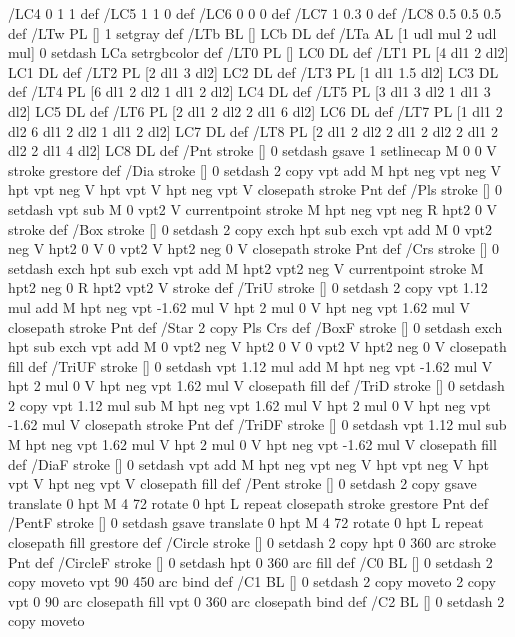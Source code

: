 {{/LC4 {0 1 1} def
/LC5 {1 1 0} def
/LC6 {0 0 0} def
/LC7 {1 0.3 0} def
/LC8 {0.5 0.5 0.5} def
/LTw {PL [] 1 setgray} def
/LTb {BL [] LCb DL} def
/LTa {AL [1 udl mul 2 udl mul] 0 setdash LCa setrgbcolor} def
/LT0 {PL [] LC0 DL} def
/LT1 {PL [4 dl1 2 dl2] LC1 DL} def
/LT2 {PL [2 dl1 3 dl2] LC2 DL} def
/LT3 {PL [1 dl1 1.5 dl2] LC3 DL} def
/LT4 {PL [6 dl1 2 dl2 1 dl1 2 dl2] LC4 DL} def
/LT5 {PL [3 dl1 3 dl2 1 dl1 3 dl2] LC5 DL} def
/LT6 {PL [2 dl1 2 dl2 2 dl1 6 dl2] LC6 DL} def
/LT7 {PL [1 dl1 2 dl2 6 dl1 2 dl2 1 dl1 2 dl2] LC7 DL} def
/LT8 {PL [2 dl1 2 dl2 2 dl1 2 dl2 2 dl1 2 dl2 2 dl1 4 dl2] LC8 DL} def
/Pnt {stroke [] 0 setdash gsave 1 setlinecap M 0 0 V stroke grestore} def
/Dia {stroke [] 0 setdash 2 copy vpt add M
  hpt neg vpt neg V hpt vpt neg V
  hpt vpt V hpt neg vpt V closepath stroke
  Pnt} def
/Pls {stroke [] 0 setdash vpt sub M 0 vpt2 V
  currentpoint stroke M
  hpt neg vpt neg R hpt2 0 V stroke
 } def
/Box {stroke [] 0 setdash 2 copy exch hpt sub exch vpt add M
  0 vpt2 neg V hpt2 0 V 0 vpt2 V
  hpt2 neg 0 V closepath stroke
  Pnt} def
/Crs {stroke [] 0 setdash exch hpt sub exch vpt add M
  hpt2 vpt2 neg V currentpoint stroke M
  hpt2 neg 0 R hpt2 vpt2 V stroke} def
/TriU {stroke [] 0 setdash 2 copy vpt 1.12 mul add M
  hpt neg vpt -1.62 mul V
  hpt 2 mul 0 V
  hpt neg vpt 1.62 mul V closepath stroke
  Pnt} def
/Star {2 copy Pls Crs} def
/BoxF {stroke [] 0 setdash exch hpt sub exch vpt add M
  0 vpt2 neg V hpt2 0 V 0 vpt2 V
  hpt2 neg 0 V closepath fill} def
/TriUF {stroke [] 0 setdash vpt 1.12 mul add M
  hpt neg vpt -1.62 mul V
  hpt 2 mul 0 V
  hpt neg vpt 1.62 mul V closepath fill} def
/TriD {stroke [] 0 setdash 2 copy vpt 1.12 mul sub M
  hpt neg vpt 1.62 mul V
  hpt 2 mul 0 V
  hpt neg vpt -1.62 mul V closepath stroke
  Pnt} def
/TriDF {stroke [] 0 setdash vpt 1.12 mul sub M
  hpt neg vpt 1.62 mul V
  hpt 2 mul 0 V
  hpt neg vpt -1.62 mul V closepath fill} def
/DiaF {stroke [] 0 setdash vpt add M
  hpt neg vpt neg V hpt vpt neg V
  hpt vpt V hpt neg vpt V closepath fill} def
/Pent {stroke [] 0 setdash 2 copy gsave
  translate 0 hpt M 4 {72 rotate 0 hpt L} repeat
  closepath stroke grestore Pnt} def
/PentF {stroke [] 0 setdash gsave
  translate 0 hpt M 4 {72 rotate 0 hpt L} repeat
  closepath fill grestore} def
/Circle {stroke [] 0 setdash 2 copy
  hpt 0 360 arc stroke Pnt} def
/CircleF {stroke [] 0 setdash hpt 0 360 arc fill} def
/C0 {BL [] 0 setdash 2 copy moveto vpt 90 450 arc} bind def
/C1 {BL [] 0 setdash 2 copy moveto
	2 copy vpt 0 90 arc closepath fill
	vpt 0 360 arc closepath} bind def
/C2 {BL [] 0 setdash 2 copy moveto
}}}
